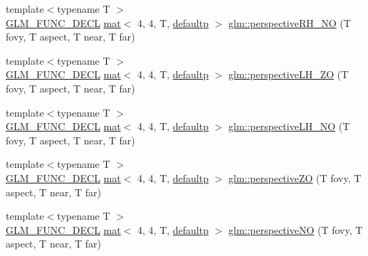 \begin{DoxyCompactItemize}
\item 
{\footnotesize template$<$typename T $>$ }\\\hyperlink{setup_8hpp_ab2d052de21a70539923e9bcbf6e83a51}{G\+L\+M\+\_\+\+F\+U\+N\+C\+\_\+\+D\+E\+CL} \hyperlink{structglm_1_1mat}{mat}$<$ 4, 4, T, \hyperlink{namespaceglm_a36ed105b07c7746804d7fdc7cc90ff25a9d21ccd8b5a009ec7eb7677befc3bf51}{defaultp} $>$ \hyperlink{group__gtc__matrix__transform_gad1526cb2cbe796095284e8f34b01c582}{glm\+::perspective\+R\+H\+\_\+\+NO} (T fovy, T aspect, T near, T far)
\item 
{\footnotesize template$<$typename T $>$ }\\\hyperlink{setup_8hpp_ab2d052de21a70539923e9bcbf6e83a51}{G\+L\+M\+\_\+\+F\+U\+N\+C\+\_\+\+D\+E\+CL} \hyperlink{structglm_1_1mat}{mat}$<$ 4, 4, T, \hyperlink{namespaceglm_a36ed105b07c7746804d7fdc7cc90ff25a9d21ccd8b5a009ec7eb7677befc3bf51}{defaultp} $>$ \hyperlink{group__gtc__matrix__transform_gaca32af88c2719005c02817ad1142986c}{glm\+::perspective\+L\+H\+\_\+\+ZO} (T fovy, T aspect, T near, T far)
\item 
{\footnotesize template$<$typename T $>$ }\\\hyperlink{setup_8hpp_ab2d052de21a70539923e9bcbf6e83a51}{G\+L\+M\+\_\+\+F\+U\+N\+C\+\_\+\+D\+E\+CL} \hyperlink{structglm_1_1mat}{mat}$<$ 4, 4, T, \hyperlink{namespaceglm_a36ed105b07c7746804d7fdc7cc90ff25a9d21ccd8b5a009ec7eb7677befc3bf51}{defaultp} $>$ \hyperlink{group__gtc__matrix__transform_gaead4d049d1feab463b700b5641aa590e}{glm\+::perspective\+L\+H\+\_\+\+NO} (T fovy, T aspect, T near, T far)
\item 
{\footnotesize template$<$typename T $>$ }\\\hyperlink{setup_8hpp_ab2d052de21a70539923e9bcbf6e83a51}{G\+L\+M\+\_\+\+F\+U\+N\+C\+\_\+\+D\+E\+CL} \hyperlink{structglm_1_1mat}{mat}$<$ 4, 4, T, \hyperlink{namespaceglm_a36ed105b07c7746804d7fdc7cc90ff25a9d21ccd8b5a009ec7eb7677befc3bf51}{defaultp} $>$ \hyperlink{group__gtc__matrix__transform_gaa9dfba5c2322da54f72b1eb7c7c11b47}{glm\+::perspective\+ZO} (T fovy, T aspect, T near, T far)
\item 
{\footnotesize template$<$typename T $>$ }\\\hyperlink{setup_8hpp_ab2d052de21a70539923e9bcbf6e83a51}{G\+L\+M\+\_\+\+F\+U\+N\+C\+\_\+\+D\+E\+CL} \hyperlink{structglm_1_1mat}{mat}$<$ 4, 4, T, \hyperlink{namespaceglm_a36ed105b07c7746804d7fdc7cc90ff25a9d21ccd8b5a009ec7eb7677befc3bf51}{defaultp} $>$ \hyperlink{group__gtc__matrix__transform_gaf497e6bca61e7c87088370b126a93758}{glm\+::perspective\+NO} (T fovy, T aspect, T near, T far)

\end{DoxyCompactItemize}
